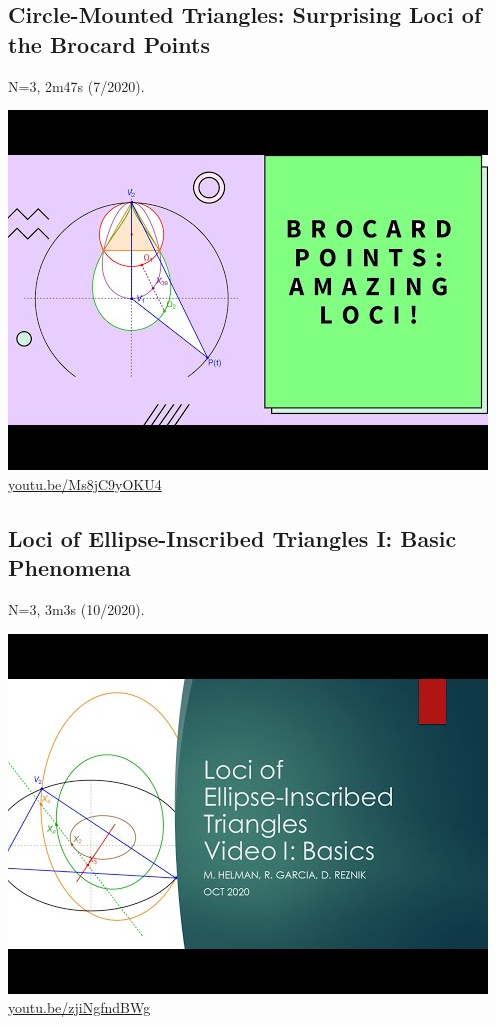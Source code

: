 \documentclass[12pt]{amsart}
\begin{document}
\subsection{Circle-Mounted Triangles: Surprising Loci of the Brocard Points}
\label{vid:Ms8jC9yOKU4}
\noindent N=3, 2m47s (7/2020). 
\begin{center}\includegraphics[width=.5\textwidth]{pics/Ms8jC9yOKU4.jpg} \\ 
\href{https://youtu.be/Ms8jC9yOKU4}{\url{youtu.be/Ms8jC9yOKU4}}\end{center}
% 

\subsection{Loci of Ellipse-Inscribed Triangles I: Basic Phenomena}
\label{vid:zjiNgfndBWg}
\noindent N=3, 3m3s (10/2020). 
\begin{center}\includegraphics[width=.5\textwidth]{pics/zjiNgfndBWg.jpg} \\ 
\href{https://youtu.be/zjiNgfndBWg}{\url{youtu.be/zjiNgfndBWg}}\end{center}
% 
\end{document}
